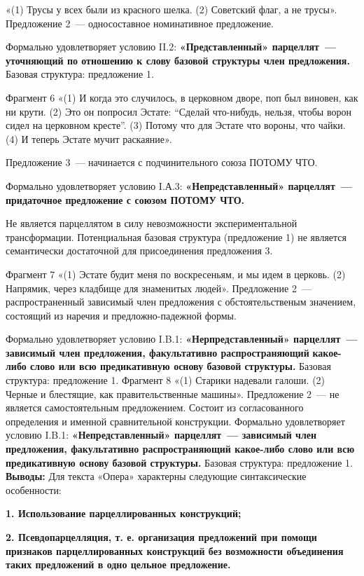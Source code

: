 \documentclass{kursa4}
\begin{document}
     «(1) Трусы у всех были из красного шелка. (2) Советский флаг, а не трусы». Предложение 2~--- односоставное номинативное предложение. 

     Формально удовлетворяет условию II.2: \textbf{«Представленный» парцеллят~--- уточняющий по отношению к слову базовой структуры член предложения. }Базовая структура: предложение 1. 

     Фрагмент 6 «(1) И когда это случилось, в церковном дворе, поп был виновен, как ни крути. (2) Это он попросил Эстате: “Сделай что-нибудь, нельзя, чтобы ворон сидел на церковном кресте”. (3) Потому что для Эстате что вороны, что чайки. (4) И теперь Эстате мучит раскаяние». 

     Предложение 3~--- начинается с подчинительного союза ПОТОМУ ЧТО. 

     Формально удовлетворяет условию I.А.3: \textbf{«Непредставленный» парцеллят~--- придаточное предложение с союзом ПОТОМУ ЧТО.} 

     Не является парцеллятом в силу невозможности экспериментальной трансформации. Потенциальная базовая структура (предложение 1) не является семантически достаточной для присоединения предложения 3. 

     Фрагмент 7 «(1) Эстате будит меня по воскресеньям, и мы идем в церковь. (2) Напрямик, через кладбище для знаменитых людей». Предложение 2~--- распространенный зависимый член предложения с обстоятельственым значением, состоящий из наречия и предложно-падежной формы. 

     Формально удовлетворяет условию I.B.1: \textbf{«}\textbf{Нерпредставленный» парцеллят~--- зависимый член предложения, факультативно распространяющий }\textbf{какое-либо слово или всю предикативную основу базовой структуры. }Базовая структура: предложение 1. Фрагмент 8 «(1) Старики надевали галоши. (2) Черные и блестящие, как правительственные машины». Предложение 2~--- не является самостоятельным предложением. Состоит из согласованного определения и именной сравнительной конструкции. Формально удовлетворяет условию I.B.1: \textbf{«}\textbf{Непредставленный» парцеллят~--- зависимый член предложения, факультативно распространяющий какое-либо слово или всю предикативную основу базовой структуры.} Базовая структура: предложение 1. \textbf{Выводы:} \textmd{Для текста «Опера» характерны следующие синтаксические особенности:}

      {\bfseries\color[rgb]{0.2,0.2,0.2}
      \textmd{1. Использование парцеллированных конструкций;}}

      {\bfseries\color[rgb]{0.2,0.2,0.2}
      \textmd{2. Псевдопарцелляция, т. е. организация предложений при помощи признаков парцеллированных конструкций }\textmd{без возможности объединения таких предложений в одно цельное предложение.}}
\end{document}
